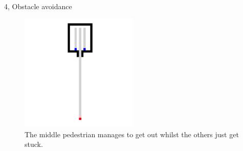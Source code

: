 \documentclass[10pt,a4paper]{article}
\begin{document}
\begin{task}{4, Obstacle avoidance}
\begin{figure}[H]
    \centering
    \includegraphics[width=0.5\textwidth]{pictures/task4_cong_stuck.jpeg}
    \caption{The middle pedestrian manages to get out whilst the others just get stuck.}
    \label{fig:cong_stuck}
\end{figure}
\end{task}
\newpage
\end{document}
